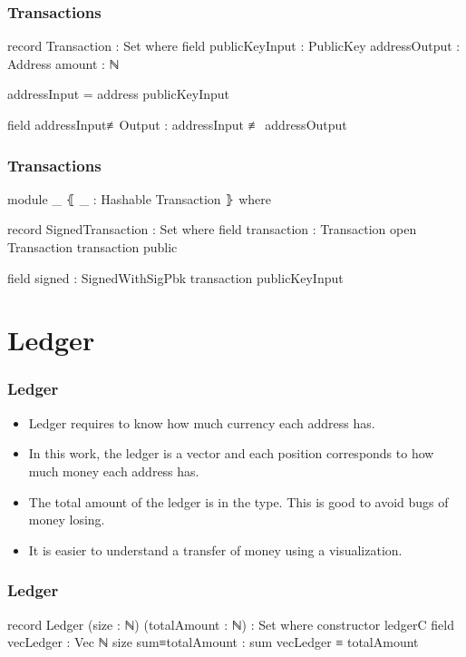 \documentclass{beamer}
\begin{document}
\begin{frame}
  \frametitle{Transactions}
\begin{code}
  record Transaction : Set where
    field
      publicKeyInput : PublicKey
      addressOutput  : Address
      amount         : ℕ

    addressInput = address publicKeyInput

    field
      addressInput≢Output : addressInput ≢ addressOutput

\end{code}
\end{frame}

\begin{frame}
  \frametitle{Transactions}
\begin{code}

  module _ ⦃ _ : Hashable Transaction ⦄ where

    record SignedTransaction  : Set where
      field
        transaction : Transaction
      open Transaction transaction public

      field
        signed : SignedWithSigPbk transaction publicKeyInput
\end{code}
\end{frame}

\section{Ledger}

\begin{frame}
  \frametitle{Ledger}
   \begin{itemize}[<+->]
     \item Ledger requires to know how much currency each address has.
     \item In this work, the ledger is a vector and each position corresponds to how much money each address has.
     \item The total amount of the ledger is in the type. This is good to avoid bugs of money losing.
     \item It is easier to understand a transfer of money using a visualization.
   \end{itemize}
\end{frame}


\begin{frame}
  \frametitle{Ledger}
\begin{code}
record Ledger (size : ℕ) (totalAmount : ℕ) : Set where
  constructor ledgerC
  field
    vecLedger       : Vec ℕ size
    sum≡totalAmount : sum vecLedger ≡ totalAmount
\end{code}
\end{frame}
\end{document}
